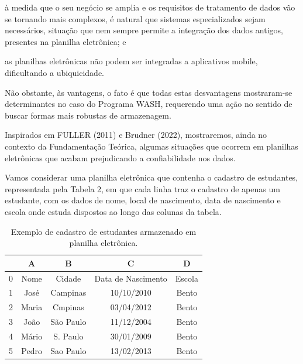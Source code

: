 \documentclass[
12pt,		%
openright,	%
twoside,  %
a4paper,			%
chapter=TITLE,		%
english,			%
french,				%
spanish,			%
brazil				%
]{USPSC-classe/USPSC}
\begin{document}
\begin{alineas}
\item \`a medida que o seu \textquotedbl  neg\'ocio \textquotedbl  se amplia e os requisitos de tratamento de dados v\~ao se tornando mais complexos, \'e natural que sistemas especializados sejam necess\'arios, situa\c{c}\~ao que nem sempre permite a integra\c{c}\~ao dos dados antigos, presentes na planilha eletr\^onica; e
\item as planilhas eletr\^onicas n\~ao podem ser integradas a aplicativos mobile, dificultando a ubiquicidade.
\end{alineas}

N\~ao obstante, \`as vantagens, o fato \'e que todas estas desvantagens mostraram-se determinantes no caso do Programa WASH, requerendo uma a\c{c}\~ao no sentido de buscar formas mais robustas de armazenagem.








Inspirados em  FULLER (2011) e  Brudner (2022), mostraremos, ainda no contexto da Fundamenta\c{c}\~ao Te\'orica, algumas situa\c{c}\~oes que ocorrem em planilhas eletr\^onicas que acabam prejudicando a confiabilidade nos dados.








Vamos considerar uma planilha  eletr\^onica que contenha o cadastro de estudantes, representada pela Tabela 2, em que cada linha traz o cadastro de apenas um estudante, com os dados de nome, local de nascimento, data de nascimento e escola onde estuda dispostos ao longo das colunas da tabela.












\begin{table}[htb]
\tiny
\caption{\label{ddd7a335bbc10f88eaaf4abda266d151f0ba0e6f}Exemplo de cadastro de estudantes armazenado em planilha eletr\^onica.}

\centering
\begin{tabular}{|c|c|c|c|c|}
\hline
  &  A  &  B  &  C  &  D  \\
\hline
0 & Nome  &  Cidade  &  Data de Nascimento  &  Escola \\
1 & Jos\'e  &  Campinas  &  10/10/2010  &  Bento \\
2 & Maria  &  Cmpinas  &  03/04/2012  &  Bento \\
3 & Jo\~ao  &  S\~ao Paulo  &  11/12/2004  &  Bento \\
4 & M\'ario  &  S. Paulo  &  30/01/2009  &  Bento \\
5 & Pedro  &  Sao Paulo  &  13/02/2013  &  Bento \\
\hline
\end{tabular}
\end{table}
\end{document}
